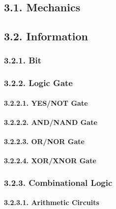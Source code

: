 \documentclass[
]{article}
\begin{document}
\hypertarget{mechanics}{%
\subsection{3.1. Mechanics}\label{mechanics}}

\hypertarget{information}{%
\subsection{3.2. Information}\label{information}}

\hypertarget{bit}{%
\subsubsection{3.2.1. Bit}\label{bit}}

\hypertarget{logic-gate}{%
\subsubsection{3.2.2. Logic Gate}\label{logic-gate}}

\hypertarget{yesnot-gate}{%
\paragraph{3.2.2.1. YES/NOT Gate}\label{yesnot-gate}}

\hypertarget{andnand-gate}{%
\paragraph{3.2.2.2. AND/NAND Gate}\label{andnand-gate}}

\hypertarget{ornor-gate}{%
\paragraph{3.2.2.3. OR/NOR Gate}\label{ornor-gate}}

\hypertarget{xorxnor-gate}{%
\paragraph{3.2.2.4. XOR/XNOR Gate}\label{xorxnor-gate}}

\hypertarget{combinational-logic}{%
\subsubsection{3.2.3. Combinational Logic}\label{combinational-logic}}

\hypertarget{arithmetic-circuits}{%
\paragraph{3.2.3.1. Arithmetic Circuits}\label{arithmetic-circuits}}
\end{document}
